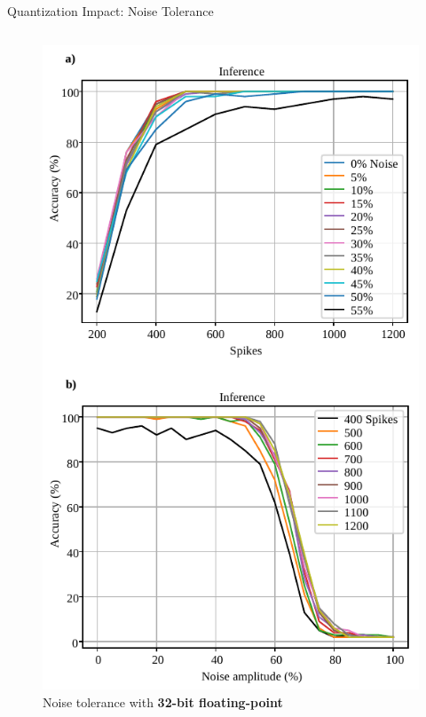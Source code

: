 \begin{frame}{Quantization Impact: Noise Tolerance}
	\begin{columns}
		\begin{column}{0.33\textwidth}
			\centering
			\begin{figure}
				\includegraphics[width=0.75\linewidth]{../chapters/sbs_accelerator/figures/accuracy_vs_noise_pu_fp.pdf} %
				\caption{ Noise tolerance with \textbf{32-bit floating-point}}
			\end{figure}
			\pause
		\end{column}
		

\end{columns}
\end{frame}
